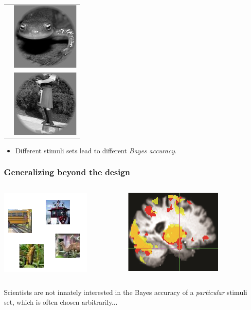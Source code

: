 \documentclass{beamer}
\begin{document}
\begin{frame}
\begin{multicols}{2}
\begin{tabular}{cc}
& \includegraphics[scale = 0.2]{img7.png} \\
& \includegraphics[scale = 0.2]{img8.png} 
\end{tabular}

\end{multicols}
\begin{itemize}
\item Different stimuli sets lead to different \emph{Bayes accuracy}.
\end{itemize}
\end{frame}

\begin{frame}
\frametitle{Generalizing beyond the design}

\begin{columns}
\begin{column}{0.6\textwidth}
\begin{center}
\includegraphics[scale = 1]{imagenet_sub.png}
\end{center}
\end{column}
\begin{column}{0.4\textwidth}
\includegraphics[scale = 0.5]{smbrain2.png}
\end{column}
\end{columns}

Scientists are not innately interested in the Bayes accuracy of a \emph{particular} stimuli set, which is often chosen arbitrarily...

\end{frame}
\end{document}

